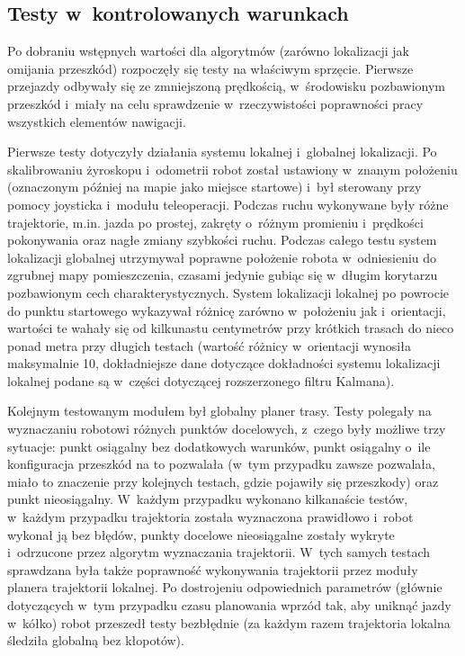 \subsection{Testy w~kontrolowanych warunkach}

Po dobraniu wstępnych wartości dla algorytmów (zarówno lokalizacji jak 
omijania przeszkód) rozpoczęły się testy na właściwym sprzęcie. Pierwsze 
przejazdy odbywały się ze zmniejszoną prędkością, w~środowisku pozbawionym
przeszkód i~miały na celu sprawdzenie w~rzeczywistości poprawności pracy
wszystkich elementów nawigacji.

Pierwsze testy dotyczyły działania systemu lokalnej i~globalnej lokalizacji.
Po skalibrowaniu żyroskopu i~odometrii robot został ustawiony w~znanym położeniu
(oznaczonym później na mapie jako miejsce startowe) i~był sterowany przy pomocy
joysticka i~modułu teleoperacji. Podczas ruchu wykonywane były różne trajektorie,
m.in. jazda po prostej, zakręty o~różnym promieniu i~prędkości pokonywania
oraz nagłe zmiany szybkości ruchu. Podczas całego testu system lokalizacji 
globalnej utrzymywał poprawne położenie robota w~odniesieniu do zgrubnej mapy 
pomieszczenia, czasami jedynie gubiąc się w~długim korytarzu pozbawionym 
cech charakterystycznych. System lokalizacji lokalnej po powrocie do punktu 
startowego wykazywał różnicę zarówno w~położeniu jak i~orientacji, wartości
te wahały się od kilkunastu centymetrów przy krótkich trasach do nieco ponad
metra przy długich testach (wartość różnicy w~orientacji wynosiła maksymalnie 10\textdegree,
dokładniejsze dane dotyczące dokładności systemu lokalizacji lokalnej podane
są w~części dotyczącej rozszerzonego filtru Kalmana).

Kolejnym testowanym modułem był globalny planer trasy. Testy polegały na 
wyznaczaniu robotowi różnych punktów docelowych, z~czego były możliwe 
trzy sytuacje: punkt osiągalny bez dodatkowych warunków, punkt osiągalny 
o~ile konfiguracja przeszkód na to pozwalała (w~tym przypadku zawsze pozwalała, 
miało to znaczenie przy kolejnych testach, gdzie pojawiły się przeszkody) 
oraz punkt nieosiągalny. W~każdym przypadku wykonano kilkanaście testów,
w~każdym przypadku trajektoria została wyznaczona prawidłowo i~robot wykonał
ją bez błędów, punkty docelowe nieosiągalne zostały wykryte i~odrzucone przez 
algorytm wyznaczania trajektorii. W~tych samych testach sprawdzana była także
poprawność wykonywania trajektorii przez moduły planera trajektorii lokalnej.
Po dostrojeniu odpowiednich parametrów (głównie dotyczących w~tym przypadku
czasu planowania wprzód tak, aby uniknąć jazdy w~kółko) robot przeszedł
testy bezbłędnie (za każdym razem trajektoria lokalna śledziła globalną 
bez kłopotów). 


